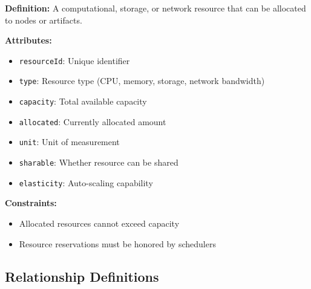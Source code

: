 \documentclass[11pt,letterpaper]{article}
\begin{document}
\begin{definitionbox}
\textbf{Definition:} A computational, storage, or network resource that can be allocated to nodes or artifacts.

\textbf{Attributes:}
\begin{itemize}[nosep]
    \item \texttt{resourceId}: Unique identifier
    \item \texttt{type}: Resource type (CPU, memory, storage, network bandwidth)
    \item \texttt{capacity}: Total available capacity
    \item \texttt{allocated}: Currently allocated amount
    \item \texttt{unit}: Unit of measurement
    \item \texttt{sharable}: Whether resource can be shared
    \item \texttt{elasticity}: Auto-scaling capability
\end{itemize}

\textbf{Constraints:}
\begin{itemize}[nosep]
    \item Allocated resources cannot exceed capacity
    \item Resource reservations must be honored by schedulers
\end{itemize}
\end{definitionbox}

\subsection{Relationship Definitions}
\end{document}
